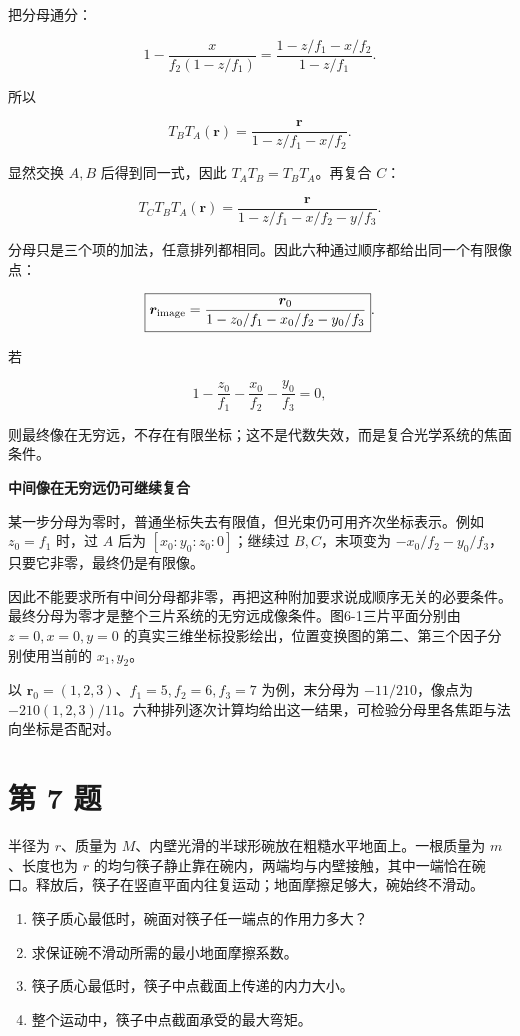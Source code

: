 \documentclass[12pt,a4paper,UTF8]{ctexart}
\newcommand{\tightlist}{\setlength{\itemsep}{0pt}\setlength{\parskip}{0pt}}
\begin{document}
把分母通分：

\[1-\frac{x}{f_2(1-z/f_1)}
=\frac{1-z/f_1-x/f_2}{1-z/f_1}.\]

所以

\[T_BT_A(\bm r)
=\frac{\bm r}{1-z/f_1-x/f_2}.\]

显然交换 \(A,B\) 后得到同一式，因此 \(T_AT_B=T_BT_A\)。再复合 \(C\)：

\[T_CT_BT_A(\bm r)
=\frac{\bm r}{1-z/f_1-x/f_2-y/f_3}.\]

分母只是三个项的加法，任意排列都相同。因此六种通过顺序都给出同一个有限像点：

\[\boxed{
\bm r_{\rm image}
=\frac{\bm r_0}{1-z_0/f_1-x_0/f_2-y_0/f_3}
}.\]

若

\[1-\frac{z_0}{f_1}-\frac{x_0}{f_2}-\frac{y_0}{f_3}=0,\]

则最终像在无穷远，不存在有限坐标；这不是代数失效，而是复合光学系统的焦面条件。

\textbf{中间像在无穷远仍可继续复合}

某一步分母为零时，普通坐标失去有限值，但光束仍可用齐次坐标表示。例如
\(z_0=f_1\) 时，过 \(A\) 后为 \([x_0:y_0:z_0:0]\)；继续过
\(B,C\)，末项变为 \(-x_0/f_2-y_0/f_3\)，只要它非零，最终仍是有限像。

因此不能要求所有中间分母都非零，再把这种附加要求说成顺序无关的必要条件。最终分母为零才是整个三片系统的无穷远成像条件。图6-1三片平面分别由
\(z=0,x=0,y=0\)
的真实三维坐标投影绘出，位置变换图的第二、第三个因子分别使用当前的
\(x_1,y_2\)。

以 \(\bm r_0=(1,2,3)\)、\(f_1=5,f_2=6,f_3=7\) 为例，末分母为
\(-11/210\)，像点为
\(-210(1,2,3)/11\)。六种排列逐次计算均给出这一结果，可检验分母里各焦距与法向坐标是否配对。

\newpage

\section{第 7 题}\label{ux7b2c-7-ux9898}

半径为 \(r\)、质量为
\(M\)、内壁光滑的半球形碗放在粗糙水平地面上。一根质量为 \(m\)、长度也为
\(r\)
的均匀筷子静止靠在碗内，两端均与内壁接触，其中一端恰在碗口。释放后，筷子在竖直平面内往复运动；地面摩擦足够大，碗始终不滑动。

\begin{enumerate}
\def\labelenumi{\arabic{enumi}.}
\tightlist
\item
  筷子质心最低时，碗面对筷子任一端点的作用力多大？
\item
  求保证碗不滑动所需的最小地面摩擦系数。
\item
  筷子质心最低时，筷子中点截面上传递的内力大小。
\item
  整个运动中，筷子中点截面承受的最大弯矩。
\end{enumerate}
\end{document}
